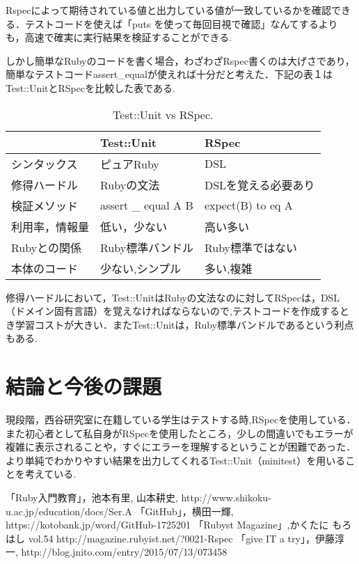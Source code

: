\documentclass[a4j,twocolumn,uplatex]{jsarticle}
\begin{document}
Rspecによって期待されている値と出力している値が一致しているかを確認できる．テストコードを使えば「puts を使って毎回目視で確認」なんてするよりも，高速で確実に実行結果を検証することができる.

しかし簡単なRubyのコードを書く場合，わざわざRspec書くのは大げさであり，簡単なテストコードassert\_equalが使えれば十分だと考えた．下記の表１はTest::UnitとRSpecを比較した表である.

\begin{table}[htb]
  \begin{center}
   \caption{Test::Unit vs RSpec.}
   \begin{tabular}{|l||l|l|} \hline
        & Test::Unit  &  RSpec  \\
    \hline \hline
    シンタックス  & ピュアRuby  & DSL \\
    修得ハードル  & Rubyの文法   &  DSLを覚える必要あり\\
    検証メソッド  & assert \_ equal A B  &  expect(B) to eq A \\
    利用率，情報量&低い，少ない&高い多い\\
    Rubyとの関係 & Ruby標準バンドル& Ruby標準ではない\\
    本体のコード&少ない,シンプル&多い,複雑\\
    \hline
  \end{tabular}
  \end{center}
\end{table}

修得ハードルにおいて，Test::UnitはRubyの文法なのに対してRSpecは，DSL（ドメイン固有言語）を覚えなければならないので,テストコードを作成するとき学習コストが大きい．またTest::Unitは，Ruby標準バンドルであるという利点もある\cite{4}.
\section{結論と今後の課題}
現段階，西谷研究室に在籍している学生はテストする時,RSpecを使用している．
また初心者として私自身がRSpecを使用したところ，少しの間違いでもエラーが複雑に表示されることや，すぐにエラーを理解するということが困難であった．より単純でわかりやすい結果を出力してくれるTest::Unit（minitest）を用いることを考えている.

\begin{flushleft}
\begin{thebibliography}{9}
「Ruby入門教育」，池本有里, 山本耕史, http://www.shikoku-u.ac.jp/education/docs/Ser.A
 「GitHub」，横田一輝, https://kotobank.jp/word/GitHub-1725201
 「Rubyst Magazine」,かくたに もろはし vol.54 http://magazine.rubyist.net/?0021-Rspec
 「give IT a try」，伊藤淳一, http://blog.jnito.com/entry/2015/07/13/073458
\end{thebibliography}
\end{flushleft}
\end{document}
